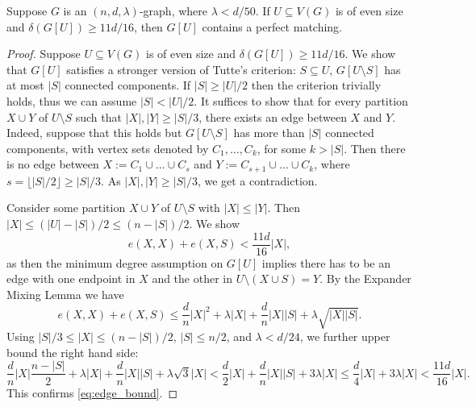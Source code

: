 \documentclass[11pt]{article}
\begin{document}

  

\begin{theorem} \label{thm:perfect-matching}
Suppose $G$ is an $(n, d, \lambda)$-graph, where $\lambda < d/50$. If $U \subseteq V(G)$ is of even size and $\delta(G[U]) \ge 11d/16$, then $G[U]$ contains a perfect matching.
\end{theorem}
\begin{proof}
  Suppose $U \subseteq V(G)$ is of even size and $\delta(G[U]) \ge 11d/16$.
  We show that $G[U]$ satisfies a stronger version of Tutte's criterion:  $S \subseteq U$, $G[U \setminus S]$ has at most $|S|$ connected components.
  If $|S| \ge |U|/2$ then the criterion trivially holds, thus we can assume $|S| < |U|/2$.
  It suffices to show that for every partition $X \cup Y$ of $U \setminus S$ such that $|X|, |Y| \ge |S|/3$, there exists an edge between $X$ and $Y$.
  Indeed, suppose that this holds but $G[U \setminus S]$ has more than $|S|$ connected components, with vertex sets denoted by $C_1, \ldots, C_k$, for some $k > |S|$.
  Then there is no edge between $X := C_1 \cup \ldots \cup C_{s}$ and $Y := C_{s+1} \cup \ldots \cup C_{k}$, where $s = \lfloor |S|/2 \rfloor \ge |S|/3$. As $|X|, |Y| \ge |S|/3$, we get a contradiction. 

    Consider some partition $X \cup Y$ of $U \setminus S$ with $|X| \le |Y|$. Then $|X| \le (|U| - |S|)/2 \le (n - |S|)/2$. We show
    \begin{equation} \label{eq:edge_bound}
        e(X, X) + e(X, S) < \frac{11d}{16}|X|,
    \end{equation}
    as then the minimum degree assumption on $G[U]$ implies there has to be an edge with one endpoint in $X$ and the other in $U \setminus (X \cup S) = Y$. By the Expander Mixing Lemma we have
    \[
        e(X, X) + e(X, S) \le \frac{d}{n}|X|^2 + \lambda |X| + \frac{d}{n}|X||S| + \lambda\sqrt{|X||S|}.
    \]
    Using $|S|/3 \le |X| \le (n-|S|)/2$, $|S| \le n/2$, and $\lambda < d/24$,  we further upper bound the right hand side:
    \[
        \frac{d}{n} |X| \frac{n-|S|}{2} + \lambda |X| + \frac{d}{n}|X||S| + \lambda\sqrt{3} |X| < \frac{d}{2}|X| + \frac{d}{n}|X||S| + 3 \lambda |X| \le \frac{d}{4} |X| + 3\lambda |X| < \frac{11d}{16}|X|.
    \]
    This confirms \eqref{eq:edge_bound}.
\end{proof}
\end{document}
